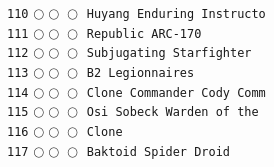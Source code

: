 \documentclass[a4paper,landscape]{article}
\begin{document}
\begin{multicols*}{5}
\texttt{110} \(\bigcirc\!\bigcirc\!\bigcirc\)  \texttt{Huyang Enduring Instructo} \vspace{-0.3mm}\\ 
\texttt{111} \(\bigcirc\!\bigcirc\!\bigcirc\)  \texttt{Republic ARC-170} \vspace{-0.3mm}\\ 
\texttt{112} \(\bigcirc\!\bigcirc\!\bigcirc\)  \texttt{Subjugating Starfighter} \vspace{-0.3mm}\\ 
\texttt{113} \(\bigcirc\!\bigcirc\!\bigcirc\)  \texttt{B2 Legionnaires} \vspace{-0.3mm}\\ 
\texttt{114} \(\bigcirc\!\bigcirc\!\bigcirc\)  \texttt{Clone Commander Cody Comm} \vspace{-0.3mm}\\ 
\texttt{115} \(\bigcirc\!\bigcirc\!\bigcirc\)  \texttt{Osi Sobeck Warden of the } \vspace{-0.3mm}\\ 
\texttt{116} \(\bigcirc\!\bigcirc\!\bigcirc\)  \texttt{Clone} \vspace{-0.3mm}\\ 
\texttt{117} \(\bigcirc\!\bigcirc\!\bigcirc\)  \texttt{Baktoid Spider Droid} \vspace{-0.3mm}\\ 

\end{multicols*}
\end{document}
